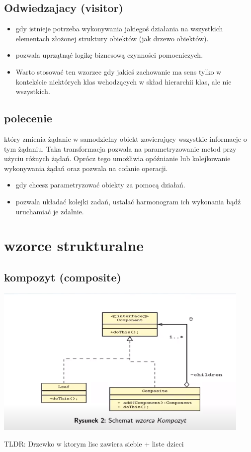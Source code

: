 \documentclass[11pt]{article}
\begin{document}
\subsection{Odwiedzajacy (visitor)}
\label{sec:org5b1da1f}
\begin{itemize}
\item gdy istnieje potrzeba wykonywania jakiegoś działania na wszystkich elementach złożonej struktury obiektów (jak drzewo obiektów).
\item pozwala uprzątnąć logikę biznesową czynności pomocniczych.
\item Warto stosować ten wzorzec gdy jakieś zachowanie ma sens tylko w kontekście niektórych klas wchodzących w skład hierarchii klas, ale nie wszystkich.
\end{itemize}
\subsection{polecenie}
\label{sec:org53ed782}
który zmienia żądanie w samodzielny obiekt zawierający wszystkie informacje o tym żądaniu. Taka transformacja pozwala na parametryzowanie metod przy użyciu różnych żądań. Oprócz tego umożliwia opóźnianie lub kolejkowanie wykonywania żądań oraz pozwala na cofanie operacji.
\begin{itemize}
\item gdy chcesz parametryzować obiekty za pomocą działań.
\item pozwala układać kolejki zadań, ustalać harmonogram ich wykonania bądź uruchamiać je zdalnie.
\end{itemize}
\section{wzorce strukturalne}
\label{sec:orgf78a3d9}
\subsection{kompozyt (composite)}
\label{sec:orgd08198f}
\begin{center}
\includegraphics[width=.9\linewidth]{./kompozyt.png}
\end{center}
TLDR: Drzewko w ktorym lisc zawiera siebie + liste dzieci
\end{document}
